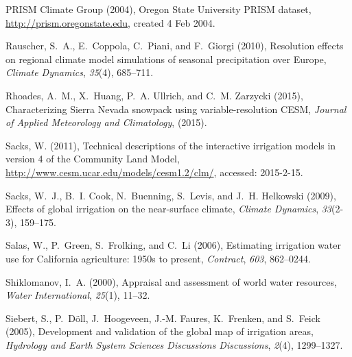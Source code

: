 \documentclass[draft,ms]{agutex}   %
\begin{document}
\begin{article}
\begin{thebibliography}{43}
{PRISM Climate Group} (2004), {Oregon State University PRISM dataset},
  \url{http://prism.oregonstate.edu}, created 4 Feb 2004.

Rauscher, S.~A., E.~Coppola, C.~Piani, and F.~Giorgi (2010), {Resolution
  effects on regional climate model simulations of seasonal precipitation over
  Europe}, \textit{Climate Dynamics}, \textit{35}(4), 685--711.

Rhoades, A.~M., X.~Huang, P.~A. Ullrich, and C.~M. Zarzycki (2015),
  {Characterizing Sierra Nevada snowpack using variable-resolution CESM},
  \textit{Journal of Applied Meteorology and Climatology}, (2015).

Sacks, W. (2011), {Technical descriptions of the interactive irrigation models
  in version 4 of the Community Land Model},
  \url{http://www.cesm.ucar.edu/models/cesm1.2/clm/}, accessed: 2015-2-15.

Sacks, W.~J., B.~I. Cook, N.~Buenning, S.~Levis, and J.~H. Helkowski (2009),
  Effects of global irrigation on the near-surface climate, \textit{Climate
  Dynamics}, \textit{33}(2-3), 159--175.

Salas, W., P.~Green, S.~Frolking, and C.~Li (2006), {Estimating irrigation
  water use for California agriculture: 1950s to present}, \textit{Contract},
  \textit{603}, 862--0244.

Shiklomanov, I.~A. (2000), Appraisal and assessment of world water resources,
  \textit{Water International}, \textit{25}(1), 11--32.

Siebert, S., P.~D{\"o}ll, J.~Hoogeveen, J.-M. Faures, K.~Frenken, and S.~Feick
  (2005), Development and validation of the global map of irrigation areas,
  \textit{Hydrology and Earth System Sciences Discussions Discussions},
  \textit{2}(4), 1299--1327.


\end{thebibliography}
\end{article}
\end{document}
